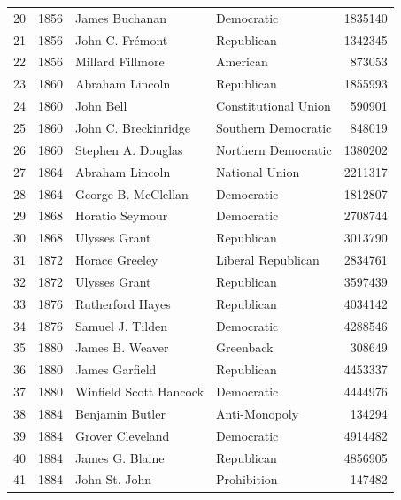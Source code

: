 \documentclass[
  letterpaper,
  DIV=11,
  numbers=noendperiod]{scrreprt}
\begin{document}
\begin{tabular}{lrllr}
20  &  1856 &          James Buchanan &             Democratic &       1835140 \\
21  &  1856 &         John C. Frémont &             Republican &       1342345 \\
22  &  1856 &        Millard Fillmore &               American &        873053 \\
23  &  1860 &         Abraham Lincoln &             Republican &       1855993 \\
24  &  1860 &               John Bell &   Constitutional Union &        590901 \\
25  &  1860 &    John C. Breckinridge &    Southern Democratic &        848019 \\
26  &  1860 &      Stephen A. Douglas &    Northern Democratic &       1380202 \\
27  &  1864 &         Abraham Lincoln &         National Union &       2211317 \\
28  &  1864 &     George B. McClellan &             Democratic &       1812807 \\
29  &  1868 &         Horatio Seymour &             Democratic &       2708744 \\
30  &  1868 &           Ulysses Grant &             Republican &       3013790 \\
31  &  1872 &          Horace Greeley &     Liberal Republican &       2834761 \\
32  &  1872 &           Ulysses Grant &             Republican &       3597439 \\
33  &  1876 &        Rutherford Hayes &             Republican &       4034142 \\
34  &  1876 &        Samuel J. Tilden &             Democratic &       4288546 \\
35  &  1880 &         James B. Weaver &              Greenback &        308649 \\
36  &  1880 &          James Garfield &             Republican &       4453337 \\
37  &  1880 &  Winfield Scott Hancock &             Democratic &       4444976 \\
38  &  1884 &         Benjamin Butler &          Anti-Monopoly &        134294 \\
39  &  1884 &        Grover Cleveland &             Democratic &       4914482 \\
40  &  1884 &         James G. Blaine &             Republican &       4856905 \\
41  &  1884 &           John St. John &            Prohibition &        147482 \\

\end{tabular}
\end{document}
